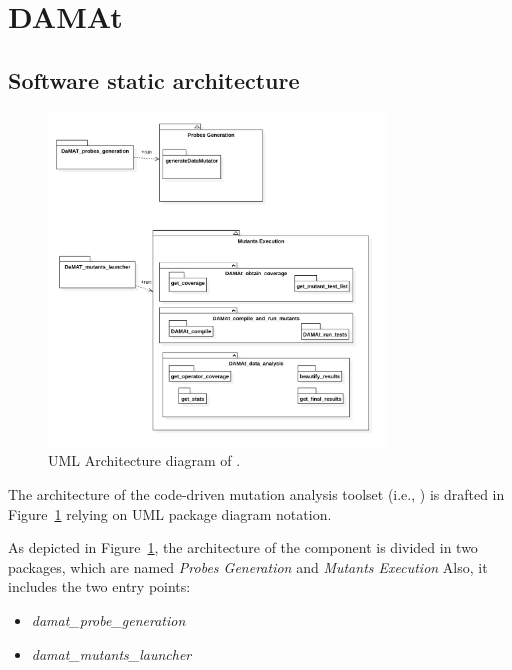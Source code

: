 
\section{DAMAt}


\subsection{Software static architecture}

\begin{figure}[h]
  \centering
	\includegraphics[width=0.8\textwidth]{images/damat_architecture_diagram.png}
      \caption{UML Architecture diagram of \dama.}
      \label{fig:damat_architecture_diagram}
\end{figure}

The architecture of the code-driven mutation analysis toolset (i.e., \dama)  is drafted in
Figure~\ref{fig:damat_architecture_diagram} relying on UML package diagram notation.

As depicted in Figure~\ref{fig:damat_architecture_diagram}, the architecture of the component is divided in two packages, which are named \textit{Probes Generation} and \textit{Mutants Execution} Also, it includes the two entry points:
\begin{itemize}
  \item \textit{damat\_probe\_generation}
  \item \textit{damat\_mutants\_launcher}
\end{itemize}

